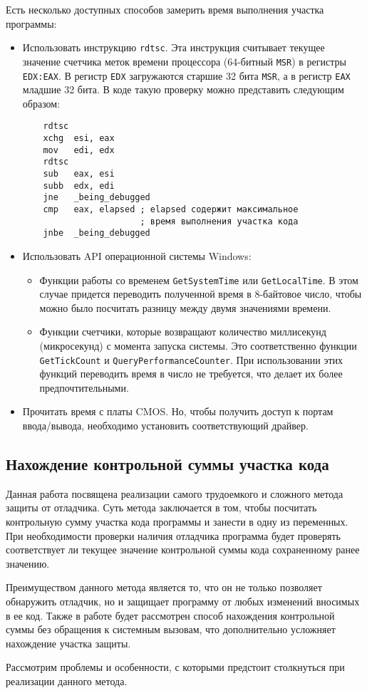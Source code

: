 Есть несколько доступных способов замерить время выполнения участка программы:
\begin{itemize}
  \item Использовать инструкцию \verb!rdtsc!. Эта инструкция считывает текущее
    значение счетчика меток времени процессора (64-битный \verb!MSR!) в регистры
    \verb!EDX:EAX!. В регистр \verb!EDX! загружаются старшие 32 бита \verb!MSR!,
    а в регистр \verb!EAX! младшие 32 бита. В коде такую проверку можно
    представить следующим образом:
    \begin{verbatim}
    rdtsc
    xchg  esi, eax
    mov   edi, edx
    rdtsc
    sub   eax, esi
    subb  edx, edi
    jne   _being_debugged
    cmp   eax, elapsed ; elapsed содержит максимальное
                       ; время выполнения участка кода
    jnbe  _being_debugged
    \end{verbatim}

  \item Использовать API операционной системы Windows:
    \begin{itemize}
      \item Функции работы со временем \verb!GetSystemTime! или
        \verb!GetLocalTime!. В этом случае придется переводить полученной время
        в 8-байтовое число, чтобы можно было посчитать разницу между двумя
        значениями времени.
      \item Функции счетчики, которые возвращают количество миллисекунд
        (микросекунд) с момента запуска системы. Это соответственно функции
        \verb!GetTickCount! и \verb!QueryPerformanceCounter!. При использовании
        этих функций переводить время в число не требуется, что делает их более
        предпочтительными.
    \end{itemize}

  \item Прочитать время с платы CMOS. Но, чтобы получить доступ к портам
    ввода/вывода, необходимо установить соответствующий драйвер.
\end{itemize}

\subsection{Нахождение контрольной суммы участка кода}
Данная работа посвящена реализации самого трудоемкого и сложного метода защиты
от отладчика. Суть метода заключается в том, чтобы посчитать контрольную сумму
участка кода программы и занести в одну из переменных. При необходимости
проверки наличия отладчика программа будет проверять соответствует ли текущее
значение контрольной суммы кода сохраненному ранее значению. 

Преимуществом данного метода является то, что он не только позволяет обнаружить
отладчик, но и защищает программу от любых изменений вносимых в ее код. Также
в работе будет рассмотрен способ нахождения контрольной суммы без обращения к
системным вызовам, что дополнительно усложняет нахождение участка защиты.

Рассмотрим проблемы и особенности, с которыми предстоит столкнуться при
реализации данного метода.
